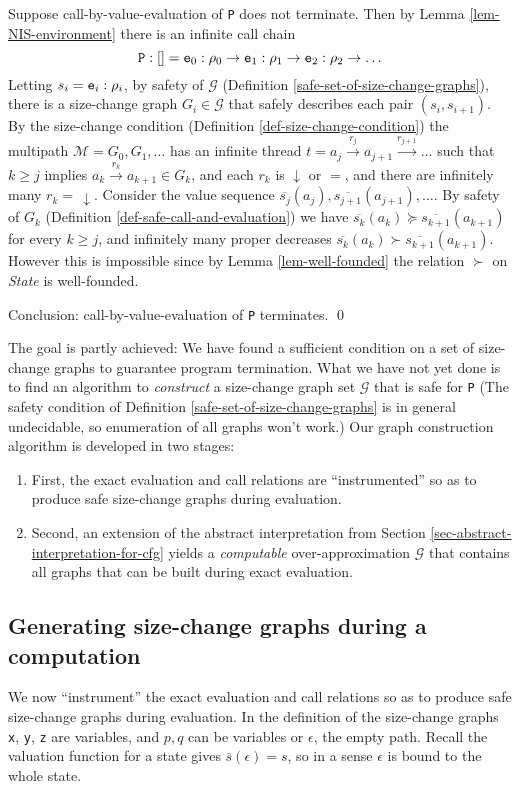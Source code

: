 \documentclass{LMCS}
\newcommand{\cal}{\mathcal}
\newcommand{\fl}{\noindent}
\newcommand{\be}{\begin{enumerate}}
\newcommand{\ee}{\end{enumerate}}
\newcommand{\bprf}{\proof}
\newcommand{\eprf}{\qed}
\theoremstyle{definition}\newtheorem{env}[thm]{Environment}
\begin{document}
\bprf
Suppose call-by-value-evaluation of {\tt P} does not terminate. Then by 
Lemma \ref{lem-NIS-environment} there is an  infinite call chain
$$
{\tt P}:[] = {\tt e}_0:\rho_0\to{\tt e}_1:\rho_1\to{\tt 
e}_2:\rho_2\to \ldots 
$$
Letting $s_i={\tt e}_i:\rho_i$, by safety of $\cal G$ 
(Definition \ref{safe-set-of-size-change-graphs}),  
there is a size-change 
graph $G_i\in\cal G$ that safely describes each pair
$(s_i,s_{i+1})$.
By the size-change condition 
(Definition \ref{def-size-change-condition}) the multipath 
${\cal M}=G_0,G_1,\ldots$ has an infinite  thread
$t = a_j \stackrel{r_j}{\to} a_{j+1} \stackrel{r_{j+1}}{\to} \ldots$ 
such that $k\geq j$ implies
$a_k \stackrel{r_k}{\to} a_{k+1}\in G_k$, and each $r_k$ is 
$\downarrow$ or $=$, and 
there are infinitely many $r_k = \,\downarrow$.
Consider the value sequence 
$\overline{s_j}(a_j), \overline{s_{j+1}}(a_{j+1}),\ldots$.
By safety of $G_k$  (Definition \ref{def-safe-call-and-evaluation})
we have 
$\overline{s_k}(a_k)\succeq\overline{s_{k+1}}(a_{k+1})$  
for every $k\geq j$,
and infinitely many  
proper decreases 
$\overline{s_k}(a_k)\succ\overline{s_{k+1}}(a_{k+1})$. 
However this 
is impossible since by Lemma \ref{lem-well-founded} the 
relation $\succ$ on {\it State} is 
well-founded.

Conclusion: call-by-value-evaluation of {\tt P} 
terminates.
\eprf

\fl The goal is partly achieved: We have found a sufficient condition 
on a set of size-change graphs to guarantee program termination. 
What we have not yet done is to find an algorithm to 
{\em construct} a size-change graph set $\cal G$ that is safe for {\tt P}
(The safety condition of 
Definition \ref{safe-set-of-size-change-graphs} is in general undecidable, so
enumeration of all graphs won't work.)
Our graph construction algorithm is developed in two stages:
\be[$\bullet$]
\item 
First, the exact evaluation and call relations are ``instrumented'' so 
as to produce safe size-change graphs during evaluation. 

\item Second, an extension of the abstract interpretation 
from Section \ref{sec-abstract-interpretation-for-cfg} yields a 
{\em computable} over-approximation $\cal G$ that  contains all graphs that can be 
built during exact evaluation. 
\ee


\subsection{Generating size-change graphs during a computation}
We now ``instrument''  the exact evaluation and call relations  so 
as to produce safe size-change graphs during evaluation. In the definition of the size-change graphs {\tt x}, {\tt y}, {\tt z} are variables, and  $p,q$ can be variables or $\epsilon$, the empty path. Recall the valuation function for a state gives $\bar s(\epsilon)=s$, so in a sense $\epsilon$ is bound to the whole state. 
\end{document}
